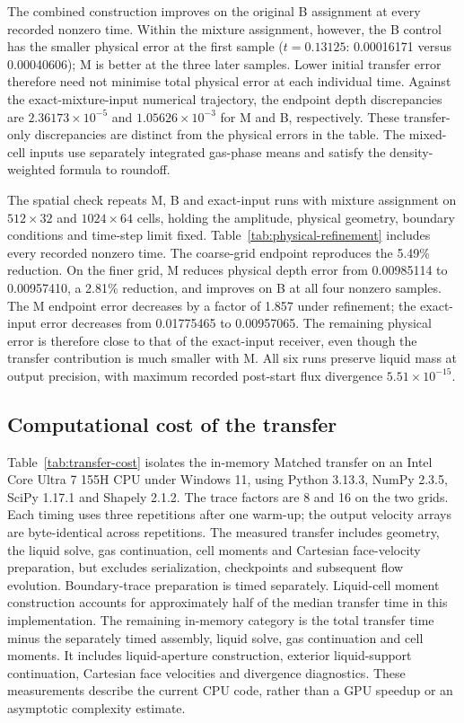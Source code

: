 \documentclass[10pt]{article}
\begin{document}
The combined construction improves on the original B assignment
at every recorded nonzero time. Within the mixture assignment, however,
the B control has the smaller physical error at the first sample
($t=0.13125$: 0.00016171 versus 0.00040606); M is better
at the three later samples. Lower initial transfer error therefore need
not minimise total physical error at each individual time.
Against the exact-mixture-input numerical trajectory, the endpoint depth
discrepancies are $2.36173\times10^{-5}$ and $1.05626\times10^{-3}$
for M and B, respectively. These transfer-only
discrepancies are distinct from the physical errors in the table.
The mixed-cell inputs use separately integrated gas-phase means and satisfy
the density-weighted formula to roundoff.


The spatial check repeats M, B and exact-input runs with mixture assignment
on $512\times32$ and $1024\times64$ cells, holding the amplitude, physical
geometry, boundary conditions and time-step limit fixed.
Table~\ref{tab:physical-refinement} includes every recorded nonzero time.
The coarse-grid endpoint reproduces the 5.49\% reduction. On the finer
grid, M reduces physical depth error from 0.00985114 to 0.00957410,
a 2.81\% reduction, and improves on B at all four nonzero samples.
The M endpoint error decreases by a factor of 1.857 under refinement;
the exact-input error decreases from 0.01775465 to 0.00957065.
The remaining physical error is therefore close to that of the exact-input
receiver, even though the transfer contribution is much smaller with M.
All six runs preserve liquid mass at output precision, with maximum recorded
post-start flux divergence $5.51\times10^{-15}$.


\subsection{Computational cost of the transfer}
Table~\ref{tab:transfer-cost} isolates the in-memory Matched transfer on
an Intel Core Ultra 7 155H CPU under Windows 11, using Python 3.13.3,
NumPy 2.3.5, SciPy 1.17.1 and Shapely 2.1.2. The trace factors are 8 and
16 on the two grids. Each timing uses three repetitions after one warm-up;
the output velocity arrays are byte-identical across repetitions.
The measured transfer includes geometry, the liquid solve, gas continuation,
cell moments and Cartesian face-velocity preparation, but excludes serialization, checkpoints
and subsequent flow evolution. Boundary-trace preparation is timed
separately. Liquid-cell moment construction accounts for approximately
half of the median transfer time in this implementation. The remaining
in-memory category is the total transfer time minus the separately timed
assembly, liquid solve, gas continuation and cell moments. It includes
liquid-aperture construction, exterior liquid-support continuation,
Cartesian face velocities and divergence diagnostics. These measurements
describe the current CPU code, rather than a GPU speedup or an asymptotic
complexity estimate.

\end{document}
